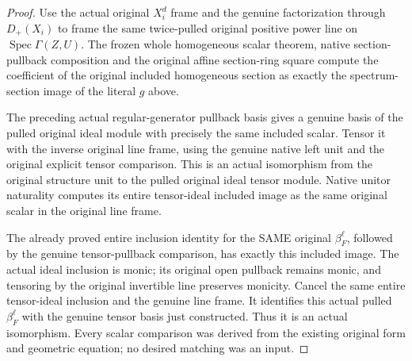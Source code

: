 \begin{proof}
Use the actual original $X_i^d$ frame and the genuine factorization
through $D_+(X_i)$ to frame the same twice-pulled original positive
power line on $\operatorname{Spec}\Gamma(Z,U)$.  The frozen whole
homogeneous scalar theorem, native section-pullback composition and
the original affine section-ring square compute the coefficient of
the original included homogeneous section as exactly the
spectrum-section image of the literal $g$ above.

The preceding actual regular-generator pullback basis gives a genuine
basis of the pulled original ideal module with precisely the same
included scalar.  Tensor it with the inverse original line frame,
using the genuine native left unit and the original explicit tensor
comparison.  This is an actual isomorphism from the original
structure unit to the pulled original ideal tensor module.  Native
unitor naturality computes its entire tensor-ideal included image as
the same original scalar in the original line frame.

The already proved entire inclusion identity for the SAME original
$\beta_F^\ell$, followed by the genuine tensor-pullback comparison,
has exactly this included image.  The actual ideal inclusion is monic;
its original open pullback remains monic, and tensoring by the
original invertible line preserves monicity.  Cancel the same entire
tensor-ideal inclusion and the genuine line frame.  It identifies
this actual pulled $\beta_F^\ell$ with the genuine tensor basis just
constructed.  Thus it is an actual isomorphism.  Every scalar
comparison was derived from the existing original form and geometric
equation; no desired matching was an input.
\end{proof}
